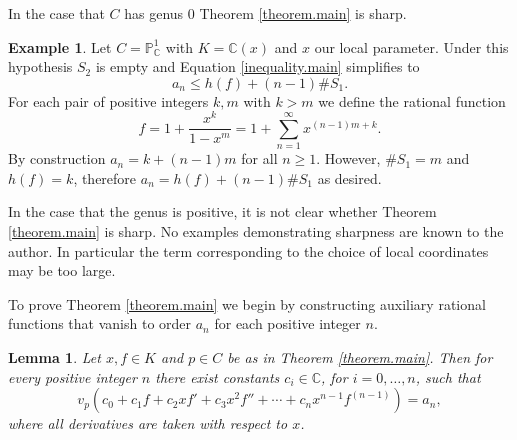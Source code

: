 \documentclass{amsart}
\newtheorem{lemma}[theorem]{Lemma}
\theoremstyle{definition}
\newtheorem{example}[theorem]{Example}
\theoremstyle{remark}
\numberwithin{equation}{section}
\begin{document}
In the case that $C$ has genus $0$ Theorem \ref{theorem.main} is sharp.

\begin{example} Let $C = \mathbb{P}^1_\mathbb{C}$ with $K = \mathbb{C}(x)$ and $x$ our local parameter. Under this hypothesis $S_2$ is empty and Equation \ref{inequality.main} simplifies to
\[
a_n \leq h(f) + (n-1)\#S_1.
\]
For each pair of positive integers $k, m$ with $k > m$ we define the rational function
\[
f = 1+\frac{x^{k}}{1-x^m} = 1 + \sum_{n=1}^\infty x^{(n-1)m+k}.
\]
By construction $a_n = k+(n-1)m$ for all $n\geq 1$. However, $\#S_1 = m$ and $h(f) = k$, therefore $a_n = h(f) + (n-1)\#S_1$ as desired.
\end{example}

In the case that the genus is positive, it is not clear whether Theorem \ref{theorem.main} is sharp. No examples demonstrating sharpness are known to the author. In particular the term corresponding to the choice of local coordinates may be too large.

To prove Theorem \ref{theorem.main} we begin by constructing auxiliary rational functions that vanish to order $a_n$ for each positive integer $n$.

\begin{lemma}\label{lemma.linearcombination}
Let $x, f \in K$ and $p \in C$ be as in Theorem \ref{theorem.main}. Then for every positive integer $n$ there exist constants $c_i\in \mathbb{C}$, for $i=0, \ldots, n$, such that
\[
v_p\left(c_0 + c_1 f + c_2 x f' + c_3 x^2 f''+ \cdots + c_n x^{n-1} f^{(n-1)}\right) = a_n,
\]
where all derivatives are taken with respect to $x$.
\end{lemma}
\end{document}
